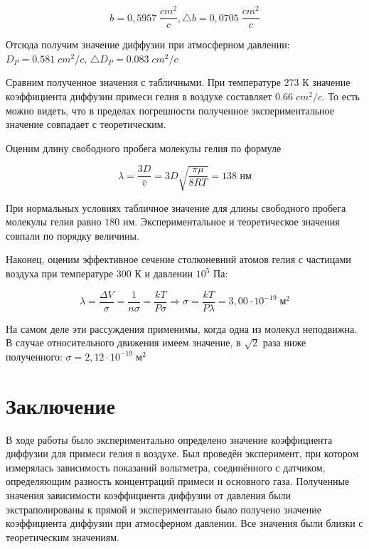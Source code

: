 \documentclass[a4paper, 12pt]{article} %
\begin{document}
\begin{equation}
    b = 0,5957 \; \frac{cm^2}{c}, \triangle b = 0,0705 \; \frac{cm^2}{c} 
\end{equation}

Отсюда получим значение диффузии при атмосферном давлении: $D_P = 0.581 \; cm^2/c$, $\triangle D_P = 0.083 \; cm^2/c$

Сравним полученное значения с табличными. При температуре $273$ К значение коэффициента диффузии примеси гелия в воздухе составляет $0.66 \; cm^2/c$. То есть можно видеть, что в пределах погрешности полученное экспериментальное значение совпадает с теоретическим.

Оценим длину свободного пробега молекулы гелия по формуле 

\begin{equation}
    \lambda = \frac{3D}{\bar v}  = 3D \sqrt{\frac{\pi \mu }{8RT}} = 138 \text{ нм}
\end{equation}

При нормальных условиях табличное значение для длины свободного пробега молекулы гелия равно $180$ нм. Экспериментальное и теоретическое значения совпали по порядку величины.

Наконец, оценим эффективное сечение столконевний атомов гелия с частицами воздуха при температуре $300$ К и давлении $10^5$ Па:

\begin{equation}
    \lambda = \frac{\Delta V}{\sigma} = \frac{1}{n \sigma} = \frac{kT}{P \sigma} \Rightarrow \sigma = \frac{kT}{P \lambda} = 3,00 \cdot 10^{-19} \; \text{м}^2
\end{equation}

На самом деле эти рассуждения применимы, когда одна из молекул неподвижна. В случае относительного движения имеем значение, в $\sqrt{2}$ раза ниже полученного: $\sigma = 2,12 \cdot 10^{-19} \; \text{м}^2$

\newpage


\section{Заключение}

В ходе работы было экспериментально определено значение коэффициента диффузии для примеси гелия в воздухе. Был проведён эксперимент, при котором измерялась зависимость показаний вольтметра, соединённого с датчиком, определяющим разность концентраций примеси и основного газа. Полученные значения зависимости коэффициента диффузии от давления были экстраполированы к прямой и экспериментаьно было получено значение коэффициента диффузии при атмосферном давлении. Все значения были близки с теоретическим значениям.
\end{document}
